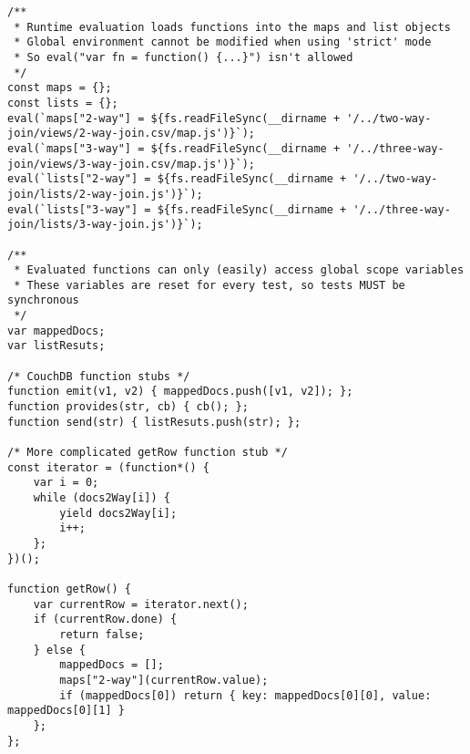 \begin{verbatim}
/**
 * Runtime evaluation loads functions into the maps and list objects
 * Global environment cannot be modified when using 'strict' mode
 * So eval("var fn = function() {...}") isn't allowed
 */
const maps = {};
const lists = {};
eval(`maps["2-way"] = ${fs.readFileSync(__dirname + '/../two-way-join/views/2-way-join.csv/map.js')}`);
eval(`maps["3-way"] = ${fs.readFileSync(__dirname + '/../three-way-join/views/3-way-join.csv/map.js')}`);
eval(`lists["2-way"] = ${fs.readFileSync(__dirname + '/../two-way-join/lists/2-way-join.js')}`);
eval(`lists["3-way"] = ${fs.readFileSync(__dirname + '/../three-way-join/lists/3-way-join.js')}`);

/**
 * Evaluated functions can only (easily) access global scope variables
 * These variables are reset for every test, so tests MUST be synchronous
 */
var mappedDocs;
var listResuts;

/* CouchDB function stubs */
function emit(v1, v2) { mappedDocs.push([v1, v2]); };
function provides(str, cb) { cb(); };
function send(str) { listResuts.push(str); };

/* More complicated getRow function stub */
const iterator = (function*() {
    var i = 0;
    while (docs2Way[i]) {
        yield docs2Way[i];
        i++;
    };
})();

function getRow() {
    var currentRow = iterator.next();
    if (currentRow.done) {
        return false;
    } else {
        mappedDocs = [];
        maps["2-way"](currentRow.value);
        if (mappedDocs[0]) return { key: mappedDocs[0][0], value: mappedDocs[0][1] }
    };
};


\end{verbatim}
